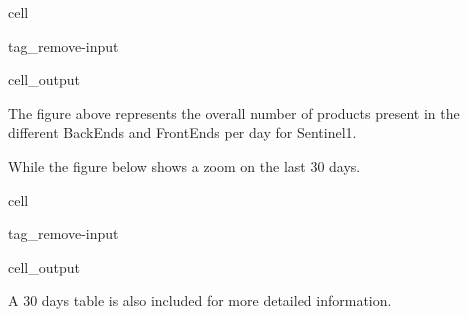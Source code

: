 \documentclass[letterpaper,10pt,english]{jupyterBook}
\begin{document}
\begin{sphinxuseclass}{cell}
\begin{sphinxuseclass}{tag_remove-input}\begin{sphinxVerbatimOutput}

\begin{sphinxuseclass}{cell_output}
\noindent{}

\end{sphinxuseclass}\end{sphinxVerbatimOutput}

\end{sphinxuseclass}
\end{sphinxuseclass}
\sphinxAtStartPar
The figure above represents the overall number of products present in the different BackEnds and FrontEnds per day for Sentinel\sphinxhyphen{}1.

\sphinxAtStartPar
While the figure below shows a zoom on the last 30 days.

\begin{sphinxuseclass}{cell}
\begin{sphinxuseclass}{tag_remove-input}\begin{sphinxVerbatimOutput}

\begin{sphinxuseclass}{cell_output}
\noindent{}

\end{sphinxuseclass}\end{sphinxVerbatimOutput}

\end{sphinxuseclass}
\end{sphinxuseclass}
\sphinxAtStartPar
A 30 days table is also included for more detailed information.
\end{document}
